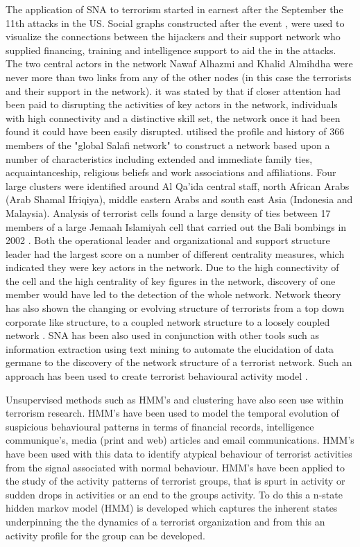 The application of SNA to terrorism started in earnest after the September the 11th attacks in the US. Social graphs constructed after the event \citep{krebs2002mapping}, \citep{krebs2002uncloaking}  were used to visualize the connections between the hijackers and their support network who supplied financing, training and intelligence support to aid the in the attacks. The two central actors in the network Nawaf Alhazmi and Khalid Almihdha were never more than two links from any of the other nodes (in this case the terrorists and their support in the network). it was stated by \citep{krebs2002mapping} that if closer attention had been paid to disrupting the activities of key actors in the network, individuals with high connectivity and a distinctive skill set, the network once it had been found it could have been easily disrupted. \citep{sageman2004understanding} utilised the profile and history of 366 members of the "global Salafi network" to construct a network based upon a number of characteristics including extended and immediate family ties, acquaintanceship, religious beliefs and work associations and affiliations. Four large clusters were identified around Al Qa'ida central staff, north African Arabs (Arab Shamal Ifriqiya), middle eastern Arabs and south east Asia (Indonesia and Malaysia). Analysis of terrorist cells found a large density of ties between 17 members of a large Jemaah Islamiyah cell that carried out the Bali bombings in 2002 \citep{koschade2006social}. Both the operational leader and organizational and support structure leader had the largest score on a number of different centrality measures, which indicated they were key actors in the network. Due to the high connectivity of the cell and the high centrality of key figures in the network, discovery of one member would have led to the detection of the whole network. Network theory has also shown the changing or evolving structure of terrorists from a top down corporate like structure, to a coupled network structure to a loosely coupled network \citep{jackson2006groups}. SNA has been also used in conjunction with other tools such as information extraction using text mining to automate the elucidation of data germane to the discovery of the network structure of a terrorist network. Such an approach has been used to create terrorist behavioural activity model \citep{ball2016automating}.

Unsupervised methods such as HMM's and clustering have also seen use within terrorism research. HMM's have been used to model the temporal evolution of suspicious behavioural patterns in terms of financial records, intelligence communique's, media (print and web) articles and email communications. HMM's have been used with this data to identify atypical behaviour of terrorist activities from the signal associated with normal behaviour\citep{allanach2004detecting}. HMM's have been applied to the study of the activity patterns of terrorist groups, that is spurt in activity or sudden drops in activities or an end to the groups activity. To do this a n-state hidden markov model (HMM) is developed which captures the inherent states underpinning the the dynamics of a terrorist organization and from this an activity profile for the group can be developed.

